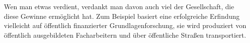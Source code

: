 Wen man etwas verdient, verdankt man davon auch viel der Gesellschaft, die diese Gewinne ermöglicht hat.
Zum Beispiel basiert eine erfolgreiche Erfindung vielleicht auf öffentlich finanzierter Grundlagenforschung, sie wird produziert von öffentlich ausgebildeten Facharbeitern und über öffentliche Straßen transportiert.